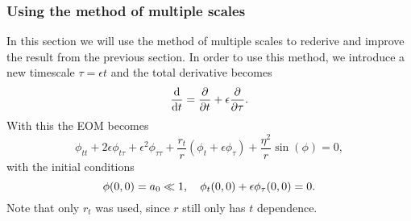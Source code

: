 \documentclass[11pt,letter, swedish, english,%
]{article}
\begin{document}



\subsubsection{Using the method of multiple scales}

In this section we will use the method of multiple scales to
rederive and improve the result from the previous section. In order to
use this method, we introduce a new timescale $\tau=\epsilon{t}$ and
the total derivative becomes
\begin{equation}
\dv{t}=\pdv{t}+\epsilon\pdv{\tau}.
\end{equation}
With this the EOM becomes
\begin{equation}\label{eq:eom_mms}
\phi_{tt}+2\epsilon\phi_{t\tau}+\epsilon^2\phi_{\tau\tau}
+\frac{r_t}{r}(\phi_t+\epsilon\phi_\tau)+\frac{\eta^2}{r}\sin(\phi)=0,
\end{equation}
with the initial conditions 
\begin{equation}\label{eq:inti_mms}
\phi(0, 0)=a_0\ll1\qcomma
\phi_t(0, 0)+\epsilon\phi_\tau(0, 0)=0.
\end{equation} 
Note that only $r_t$ was used, since $r$ still only has $t$
dependence. 
\end{document}
